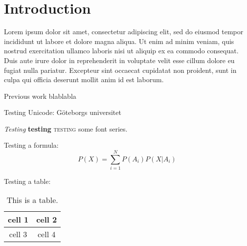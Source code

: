 \section{Introduction}
\label{sec:intro}

Lorem ipsum dolor sit amet, consectetur adipiscing elit, sed do eiusmod tempor incididunt ut labore et dolore magna aliqua. Ut enim ad minim veniam, quis nostrud exercitation ullamco laboris nisi ut aliquip ex ea commodo consequat. Duis aute irure dolor in reprehenderit in voluptate velit esse cillum dolore eu fugiat nulla pariatur. Excepteur sint occaecat cupidatat non proident, sunt in culpa qui officia deserunt mollit anim id est laborum.

Previous work \citep{hengchen2021SBXrushifteval} blablabla 

Testing Unicode: Göteborgs universitet

\textit{Testing} \textbf{testing} \textsc{testing} some font series.

Testing a formula:
\[
P(X) = \sum_{i=1}^N P(A_i) P(X|A_i)
\]

Testing a table:
\begin{table}[htbp]
\begin{center}
\begin{tabular}{c|c}
cell 1 & cell 2 \\
\hline
cell 3 & cell 4
\end{tabular}
\caption{This is a table.}
\end{center}
\end{table}
